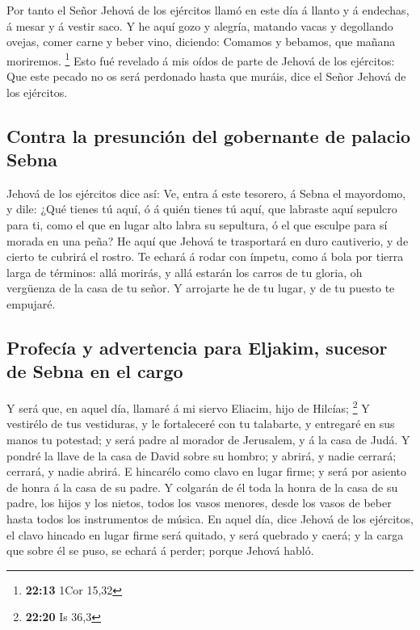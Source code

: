  Por tanto el Señor Jehová de los ejércitos llamó en este
día á llanto y á endechas, á mesar y á vestir saco.  Y he
aquí gozo y alegría, matando vacas y degollando ovejas, comer carne y
beber vino, diciendo: Comamos y bebamos, que mañana moriremos.
\footnote{\textbf{22:13} 1Cor 15,32}  Esto fué revelado á
mis oídos de parte de Jehová de los ejércitos: Que este pecado no os
será perdonado hasta que muráis, dice el Señor Jehová de los ejércitos.

\hypertarget{contra-la-presunciuxf3n-del-gobernante-de-palacio-sebna}{%
\subsection{Contra la presunción del gobernante de palacio
Sebna}\label{contra-la-presunciuxf3n-del-gobernante-de-palacio-sebna}}

 Jehová de los ejércitos dice así: Ve, entra á este
tesorero, á Sebna el mayordomo, y dile:  ¿Qué tienes tú
aquí, ó á quién tienes tú aquí, que labraste aquí sepulcro para ti, como
el que en lugar alto labra su sepultura, ó el que esculpe para sí morada
en una peña?  He aquí que Jehová te trasportará en duro
cautiverio, y de cierto te cubrirá el rostro.  Te echará
á rodar con ímpetu, como á bola por tierra larga de términos: allá
morirás, y allá estarán los carros de tu gloria, oh vergüenza de la casa
de tu señor.  Y arrojarte he de tu lugar, y de tu puesto
te empujaré.

\hypertarget{profecuxeda-y-advertencia-para-eljakim-sucesor-de-sebna-en-el-cargo}{%
\subsection{Profecía y advertencia para Eljakim, sucesor de Sebna en el
cargo}\label{profecuxeda-y-advertencia-para-eljakim-sucesor-de-sebna-en-el-cargo}}

 Y será que, en aquel día, llamaré á mi siervo Eliacim,
hijo de Hilcías; \footnote{\textbf{22:20} Is 36,3}  Y
vestirélo de tus vestiduras, y le fortaleceré con tu talabarte, y
entregaré en sus manos tu potestad; y será padre al morador de
Jerusalem, y á la casa de Judá.  Y pondré la llave de la
casa de David sobre su hombro; y abrirá, y nadie cerrará; cerrará, y
nadie abrirá.  E hincarélo como clavo en lugar firme; y
será por asiento de honra á la casa de su padre.  Y
colgarán de él toda la honra de la casa de su padre, los hijos y los
nietos, todos los vasos menores, desde los vasos de beber hasta todos
los instrumentos de música.  En aquel día, dice Jehová de
los ejércitos, el clavo hincado en lugar firme será quitado, y será
quebrado y caerá; y la carga que sobre él se puso, se echará á perder;
porque Jehová habló.

